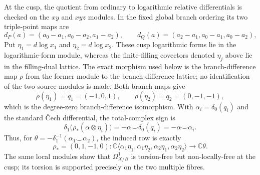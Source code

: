 \begin{enumerate}[leftmargin=1.8em,itemsep=.65em]
At the cusp, the quotient from ordinary to logarithmic relative
differentials is checked on the $xy$ and $xyz$ modules.  In the fixed global
branch ordering its two triple-point maps are
\[
 d_P(a)=(a_0-a_1,a_0-a_2,a_1-a_2),\qquad
 d_Q(a)=(a_2-a_1,a_0-a_1,a_0-a_2),
\]
Put $\eta_1=d\log x_1$ and $\eta_2=d\log x_2$.  These cusp logarithmic
forms lie in the logarithmic-form module, whereas the finite-filling
covectors denoted $\eta_j$ above lie in the filling-dual lattice.  The exact
morphism used below is the branch-difference map $\rho$ from the former
module to the branch-difference lattice; no identification of the two source
modules is made.
Both branch maps give
\[
 \rho(\eta_1)=q_1=(-1,0,1),\qquad
 \rho(\eta_2)=q_2=(0,-1,-1),
\]
which is the degree-zero branch-difference isomorphism.  With
$\alpha_i=\delta_0(q_i)$ and the standard \v Cech differential, the
total-complex sign is
\[
 \delta_1\bigl(\rho_*(\alpha\otimes\eta_i)\bigr)
 =-\alpha\smile\delta_0(q_i)=-\alpha\smile\alpha_i.
\]
Thus, for
$\theta=-\delta_1^{-1}(\alpha_1\smile\alpha_2)$, the induced row is exactly
\[
 \rho_*=(0,1,-1,0):
 \mathbb C\langle
 \alpha_1\eta_1,\alpha_1\eta_2,\alpha_2\eta_1,\alpha_2\eta_2
 \rangle\longrightarrow\mathbb C\theta.
\]
The same local modules show that $\Omega^1_{X/B}$ is torsion-free but
non-locally-free at the cusp; its torsion is supported precisely on the two
multiple fibres.


\end{enumerate}
